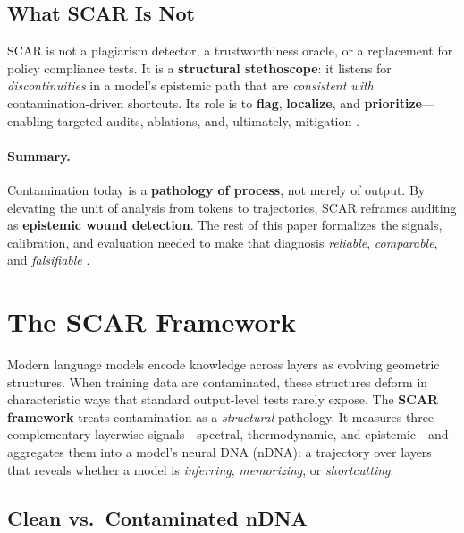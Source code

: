 \documentclass[11pt]{article}
\begin{document}
\subsection{What \textsc{SCAR} Is Not}
SCAR is not a plagiarism detector, a trustworthiness oracle, or a replacement for policy compliance tests. It is a \textbf{structural stethoscope}: it listens for \emph{discontinuities} in a model’s epistemic path that are \emph{consistent with} contamination-driven shortcuts. Its role is to \textbf{flag}, \textbf{localize}, and \textbf{prioritize}—enabling targeted audits, ablations, and, ultimately, mitigation \citep{sainz2023need}.

\paragraph{Summary.}
Contamination today is a \textbf{pathology of process}, not merely of output. By elevating the unit of analysis from tokens to trajectories, \textsc{SCAR} reframes auditing as \textbf{epistemic wound detection}. The rest of this paper formalizes the signals, calibration, and evaluation needed to make that diagnosis \emph{reliable}, \emph{comparable}, and \emph{falsifiable} \citep{raghu2017svcca,kornblith2019cka,ansuini2019intrinsic,deng2024investigating}.


% 



\section{The SCAR Framework}

Modern language models encode knowledge across layers as evolving geometric structures. When training data are contaminated, these structures deform in characteristic ways that standard output-level tests rarely expose. The \textbf{SCAR framework} treats contamination as a \emph{structural} pathology. It measures three complementary layerwise signals—spectral, thermodynamic, and epistemic—and aggregates them into a model’s neural DNA (nDNA): a trajectory over layers that reveals whether a model is \emph{inferring}, \emph{memorizing}, or \emph{shortcutting}.

\vspace{0.5em}
\subsection{Clean vs.\ Contaminated nDNA}
\end{document}
